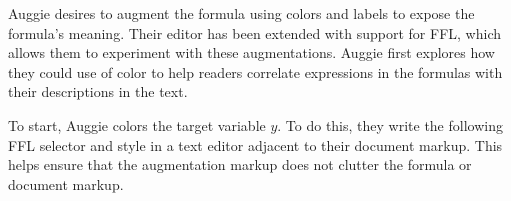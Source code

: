 Auggie desires to augment the formula using colors and labels to expose the formula's meaning. Their editor has been extended with support for FFL, which allows them to experiment with these augmentations. Auggie first explores how they could use of color to help readers correlate expressions in the formulas with their descriptions in the text.


To start, Auggie colors the target variable $y$. To do this, they write the following FFL selector and style in a text editor adjacent to their document markup. This helps ensure that the augmentation markup does not clutter the formula or document markup. \\


